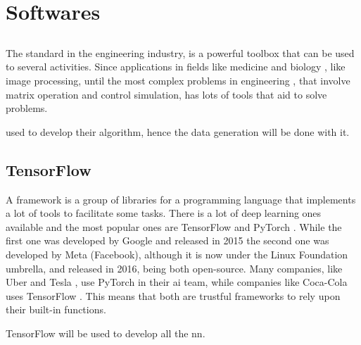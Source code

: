 \section{Softwares}

\subsection{\matlab}

The standard in the engineering industry, \matlab is a powerful toolbox that can be used to several activities.
Since applications in fields like medicine and biology \citep{demirkaya2009}, like image processing, until the most complex problems in engineering \citep{bansal}, that involve matrix operation and control simulation, \matlab has lots of tools that aid to solve problems.

\citet{geronel2023} used \matlab to develop their algorithm, hence the data generation will be done with it.

\subsection{TensorFlow}

A framework is a group of libraries for a programming language that implements a lot of tools to facilitate some tasks. 
There is a lot of deep learning ones available and the most popular ones are TensorFlow \citep{abadi2016} and PyTorch \citep{paszke2019}. 
While the first one was developed by Google and released in 2015 the second one was developed by Meta (Facebook), although it is now under the Linux Foundation umbrella, and released in 2016, being both open-source.
Many companies, like Uber \citep{goodman2017} and Tesla \citep{pytorch2019}, use PyTorch in their \gls*{ai} team, while companies like Coca-Cola uses TensorFlow \citep{tensorflow2018}.
This means that both are trustful frameworks to rely upon their built-in functions.

TensorFlow will be used to develop all the \gls*{nn}.